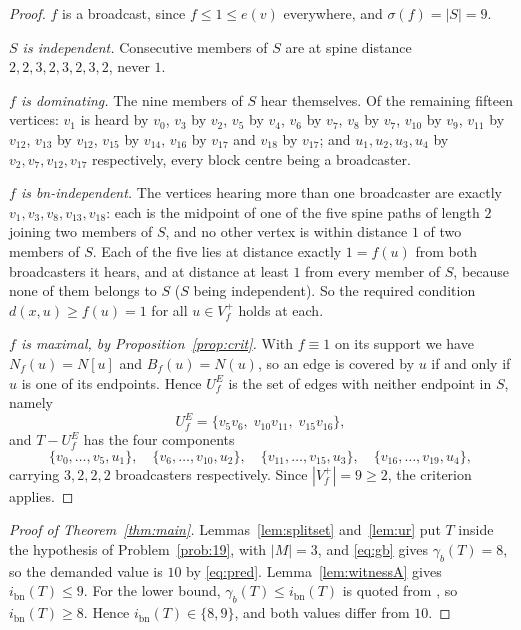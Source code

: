 \documentclass[11pt]{amsart}
\theoremstyle{definition}
\newcommand{\ibn}{i_{\mathrm{bn}}}
\newcommand{\gb}{\gamma_{b}}
\begin{document}
\begin{proof}
$f$ is a broadcast, since $f\le 1\le e(v)$ everywhere, and $\sigma(f)=|S|=9$.

\emph{$S$ is independent.} Consecutive members of $S$ are at spine distance
$2,2,3,2,3,2,3,2$, never $1$.

\emph{$f$ is dominating.} The nine members of $S$ hear themselves. Of the
remaining fifteen vertices: $v_1$ is heard by $v_0$, $v_3$ by $v_2$, $v_5$ by
$v_4$, $v_6$ by $v_7$, $v_8$ by $v_7$, $v_{10}$ by $v_9$, $v_{11}$ by $v_{12}$,
$v_{13}$ by $v_{12}$, $v_{15}$ by $v_{14}$, $v_{16}$ by $v_{17}$ and $v_{18}$ by
$v_{17}$; and $u_1,u_2,u_3,u_4$ by $v_2,v_7,v_{12},v_{17}$ respectively, every
block centre being a broadcaster.

\emph{$f$ is bn-independent.} The vertices hearing more than one broadcaster are
exactly $v_1,v_3,v_8,v_{13},v_{18}$: each is the midpoint of one of the five
spine paths of length $2$ joining two members of $S$, and no other vertex is
within distance $1$ of two members of $S$. Each of the five lies at distance
exactly $1=f(u)$ from both broadcasters it hears, and at distance at least $1$
from every member of $S$, because none of them belongs to $S$ ($S$ being
independent). So the required condition $d(x,u)\ge f(u)=1$ for all
$u\in V_f^{+}$ holds at each.

\emph{$f$ is maximal, by Proposition~\ref{prop:crit}.} With $f\equiv 1$ on
its support we have $N_f(u)=N[u]$ and $B_f(u)=N(u)$, so an edge is covered by
$u$ if and only if $u$ is one of its endpoints. Hence $U_f^{E}$ is the set of
edges with neither endpoint in $S$, namely
\[
  U_f^{E}=\{v_5v_6,\;v_{10}v_{11},\;v_{15}v_{16}\} ,
\]
and $T-U_f^{E}$ has the four components
\[
  \{v_0,\dots,v_5,u_1\},\quad\{v_6,\dots,v_{10},u_2\},\quad
  \{v_{11},\dots,v_{15},u_3\},\quad\{v_{16},\dots,v_{19},u_4\},
\]
carrying $3,2,2,2$ broadcasters respectively. Since $|V_f^{+}|=9\ge 2$, the
criterion applies.
\end{proof}

\begin{proof}[Proof of Theorem~\ref{thm:main}]
Lemmas~\ref{lem:splitset} and~\ref{lem:ur} put $T$ inside the hypothesis of
Problem~\ref{prob:19}, with $|M|=3$, and \eqref{eq:gb} gives $\gb(T)=8$, so the
demanded value is $10$ by \eqref{eq:pred}. Lemma~\ref{lem:witnessA} gives
$\ibn(T)\le 9$. For the lower bound, $\gb(T)\le\ibn(T)$ is quoted from
\cite{MM2024}, so $\ibn(T)\ge 8$. Hence $\ibn(T)\in\{8,9\}$, and both values
differ from $10$.
\end{proof}
\end{document}
